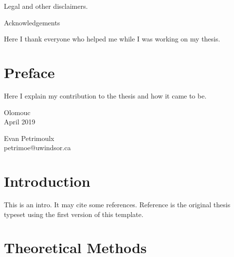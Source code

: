 \documentclass[a4paper,12pt,twoside]{report}
\begin{document}
\vfil
\noindent
Legal and other disclaimers.

\clearpage


\mbox{}
\vfil

\centerline{\Large Acknowledgements}

\bigskip

\noindent
Here I thank everyone who helped me while I was working on my thesis.

\vfil

\clearpage

\pagestyle{fancy}

\tableofcontents
{}

\chapter*{Preface}


Here I explain my contribution to the thesis and how it came to be.

\vspace{1cm}

\noindent
\parbox{.4\textwidth}{
Olomouc
\\
April 2019
}
\hfill
\parbox{.4\textwidth}{\flushright
Evan Petrimoulx
\\
petrimoe@uwindsor.ca
}

\clearpage
\pagestyle{empty}
\cleardoublepage

\pagestyle{fancy}


\chapter{Introduction}
\label{chapter.intro}

This is an intro.\autocite{Smith2017} It may cite some references.\autocite{Migdall2013Book,Straka2014,Straka2018Apr,Straka2019Thesis} Reference  is the original thesis typeset using the first version of this template.

\chapter{Theoretical Methods}
\end{document}
